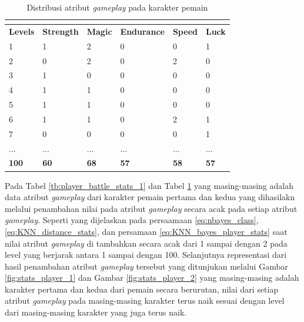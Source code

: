 \begin{longtable}{|l|l|l|l|l|l|}
	\caption{Distribusi atribut \textit{gameplay} pada karakter pemain}
	\vspace{1ex}
	\label{tb:player_battle_stats_2}\\
	\hline
	\rowcolor[HTML]{C0C0C0} 
	\textbf{Levels} & \textbf{Strength} & \textbf{Magic} & \textbf{Endurance} & \textbf{Speed} & \textbf{Luck} \\ \hline
	1 & 1 & 2 & 0 & 0 & 1 \\ \hline
	2 & 0 & 2 & 0 & 2 & 0 \\ \hline
	3 & 1 & 0 & 0 & 0 & 0 \\ \hline
	4 & 1 & 1 & 0 & 0 & 0 \\ \hline
	5 & 1 & 1 & 0 & 0 & 0 \\ \hline
	6 & 1 & 1 & 0 & 2 & 1 \\ \hline
	7 & 0 & 0 & 0 & 0 & 1 \\ \hline
	... & ... & ... & ... & ... & ... \\ \hline
	\textbf{100} & \textbf{60} & \textbf{68} & \textbf{57} & \textbf{58} & \textbf{57} \\ \hline
\end{longtable}
\vspace{1ex}

Pada Tabel \ref{tb:player_battle_stats_1} dan Tabel \ref{tb:player_battle_stats_2} yang masing-masing adalah data atribut \textit{gameplay} dari karakter pemain pertama dan kedua yang dihasilakn melalui penambahan nilai pada atribut \textit{gameplay} secara acak pada setiap atribut \textit{gameplay}. Seperti yang dijelaskan pada persaamaan \ref{eq:nbayes_class}, \ref{eq:KNN_distance_stats}, dan persamaan \ref{eq:KNN_bayes_player_stats} saat nilai atribut \textit{gameplay} di tambahkan secara acak dari 1 sampai dengan 2 pada level yang berjarak antara 1 sampai dengan 100. Selanjutnya representasi dari hasil penambahan atribut \textit{gameplay} tersebut yang ditunjukan melalui Gambar \ref{fig:stats_player_1} dan Gambar \ref{fig:stats_player_2} yang masing-masing adalah karakter pertama dan kedua dari pemain secara berurutan, nilai dari setiap atribut \textit{gameplay} pada masing-masing karakter terus naik sesuai dengan level dari masing-masing karakter yang juga terus naik. 
\vspace{1ex}

